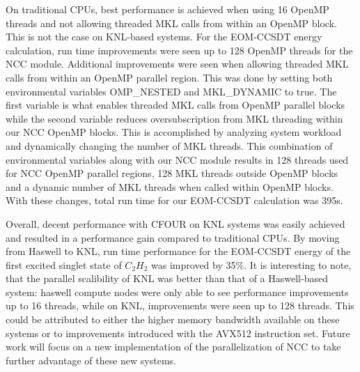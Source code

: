 On traditional CPUs, best performance is achieved when using 16 OpenMP threads and not allowing threaded MKL calls
from within an OpenMP block. This is not the case on KNL-based systems. For the EOM-CCSDT energy calculation,
run time improvements were seen up to 128 OpenMP threads for the NCC module. Additional improvements were seen
when allowing threaded MKL calls from within an OpenMP parallel region. This was done by setting both environmental
variables OMP\_NESTED and MKL\_DYNAMIC to true. The first variable is what enables threaded MKL calls from OpenMP
parallel blocks while the second variable reduces oversubscription from MKL threading within our NCC OpenMP blocks.
This is accomplished by analyzing system workload and dynamically changing the number of MKL threads. This
combination of environmental variables along with our NCC module results in 128 threads used for NCC OpenMP parallel
regions, 128 MKL threads outside OpenMP blocks and a dynamic number of MKL threads when called within OpenMP blocks.
With these changes, total run time for our EOM-CCSDT calculation was 395s.

Overall, decent performance with CFOUR on KNL systems was easily achieved and resulted in a performance
gain compared to traditional CPUs. By moving from Haswell to KNL, run time performance for the EOM-CCSDT energy
of the first excited singlet state of $C_2H_2$ was improved by 35\%. It is interesting to note, that the
parallel scalibility of KNL was better than that of a Haswell-based system: haswell compute nodes were only able
to see performance improvements up to 16 threads, while on KNL, improvements were seen up to 128 threads.
This could be attributed to either the higher memory bandwidth available on these systems or to improvements
introduced with the AVX512 instruction set. Future work will focus on a new implementation of the parallelization
of NCC to take further advantage of these new systems.
